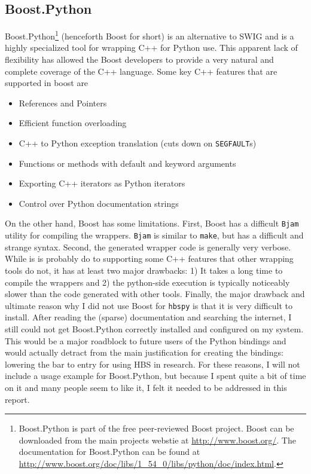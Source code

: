 \subsection{Boost.Python} \label{sub:boost_python}

  Boost.Python\footnote{Boost.Python is part of the free peer-reviewed Boost project. Boost can be downloaded from the main projects webstie at \url{http://www.boost.org/}. The documentation for Boost.Python can be found at \url{http://www.boost.org/doc/libs/1_54_0/libs/python/doc/index.html}.} (henceforth Boost for short) is an alternative to SWIG and is a highly specialized tool for wrapping C++ for Python use. This apparent lack of flexibility has allowed the Boost developers to provide a very natural and complete coverage of the C++ language. Some key C++ features that are supported in boost are

  \begin{itemize}
    \itemsep -.2in
    \item References and Pointers
    \item Efficient function overloading
    \item C++ to Python exception translation (cuts down on \texttt{SEGFAULT}s)
    \item Functions or methods with default and keyword arguments
    \item Exporting C++ iterators as Python iterators
    \item Control over Python documentation strings
  \end{itemize}

  On the other hand, Boost has some limitations. First, Boost has a difficult \texttt{Bjam} utility for compiling the wrappers. \texttt{Bjam} is similar to \texttt{make}, but has a difficult and strange syntax. Second, the generated wrapper code is generally very verbose. While is is probably do to supporting some C++ features that other wrapping tools do not, it has at least two major drawbacks: 1) It takes a long time to compile the wrappers and 2) the python-side execution is typically noticeably slower than the code generated with other tools. Finally, the major drawback and ultimate reason why I did not use Boost for \texttt{hbspy} is that it is very difficult to install. After reading the (sparse) documentation and searching the internet, I still could not get Boost.Python correctly installed and configured on my system. This would be a major roadblock to future users of the Python bindings and would actually detract from the main justification for creating the bindings: lowering the bar to entry for using HBS in research. For these reasons, I will not include a usage example for Boost.Python, but because I spent quite a bit of time on it and many people seem to like it, I felt it needed to be addressed in this report.

